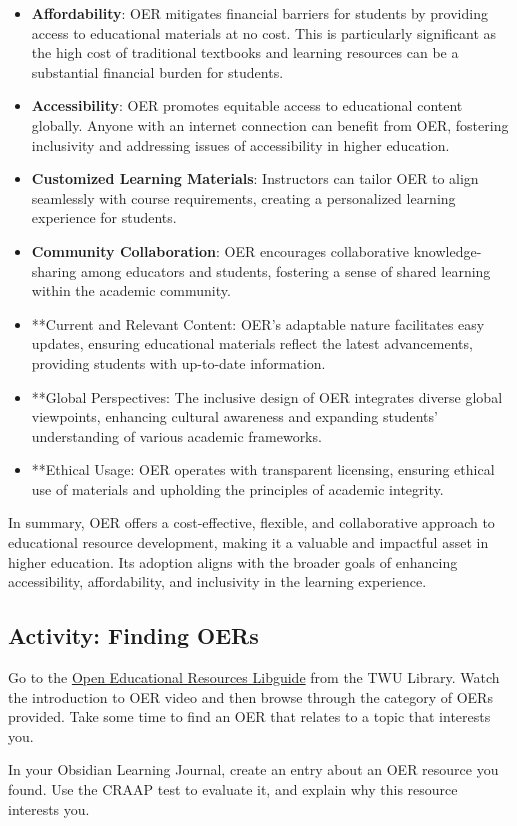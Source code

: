 \documentclass[
]{book}
\theoremstyle{definition}
\theoremstyle{definition}
\theoremstyle{definition}
\theoremstyle{definition}
\theoremstyle{remark}
\begin{document}
\begin{itemize}
\item
  \textbf{Affordability}: OER mitigates financial barriers for students by providing access to educational materials at no cost. This is particularly significant as the high cost of traditional textbooks and learning resources can be a substantial financial burden for students.
\item
  \textbf{Accessibility}: OER promotes equitable access to educational content globally. Anyone with an internet connection can benefit from OER, fostering inclusivity and addressing issues of accessibility in higher education.
\item
  \textbf{Customized Learning Materials}: Instructors can tailor OER to align seamlessly with course requirements, creating a personalized learning experience for students.
\item
  \textbf{Community Collaboration}: OER encourages collaborative knowledge-sharing among educators and students, fostering a sense of shared learning within the academic community.
\item
  **Current and Relevant Content: OER's adaptable nature facilitates easy updates, ensuring educational materials reflect the latest advancements, providing students with up-to-date information.
\item
  **Global Perspectives: The inclusive design of OER integrates diverse global viewpoints, enhancing cultural awareness and expanding students' understanding of various academic frameworks.
\item
  **Ethical Usage: OER operates with transparent licensing, ensuring ethical use of materials and upholding the principles of academic integrity.
\end{itemize}

In summary, OER offers a cost-effective, flexible, and collaborative approach to educational resource development, making it a valuable and impactful asset in higher education. Its adoption aligns with the broader goals of enhancing accessibility, affordability, and inclusivity in the learning experience.

\hypertarget{activity-finding-oers}{%
\subsection*{Activity: Finding OERs}\label{activity-finding-oers}}

\begin{reflect}
Go to the \href{https://libguides.twu.ca/oer}{Open Educational Resources Libguide} from the TWU Library. Watch the introduction to OER video and then browse through the category of OERs provided. Take some time to find an OER that relates to a topic that interests you.

In your Obsidian Learning Journal, create an entry about an OER resource you found. Use the CRAAP test to evaluate it, and explain why this resource interests you.
\end{reflect}
\end{document}
